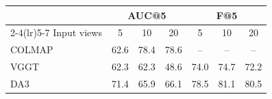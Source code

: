 \begin{tabular}{lcccccc}
\toprule
 & \multicolumn{3}{c}{AUC@5} & \multicolumn{3}{c}{F@5} \\
\cmidrule(lr){2-4}\cmidrule(lr){5-7}
Input views & 5 & 10 & 20 & 5 & 10 & 20 \\
\midrule
COLMAP & 62.6 & 78.4 & 78.6 & -- & -- & -- \\
VGGT & 62.3 & 62.3 & 48.6 & 74.0 & 74.7 & 72.2 \\
DA3 & 71.4 & 65.9 & 66.1 & 78.5 & 81.1 & 80.5 \\
\bottomrule
\end{tabular}
